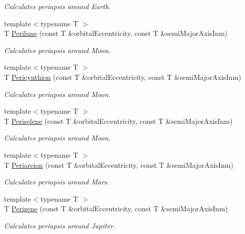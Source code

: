 \begin{DoxyCompactItemize}
\begin{DoxyCompactList}\small\item\em Calculates periapsis around Earth. \end{DoxyCompactList}\item 
{\footnotesize template$<$typename T $>$ }\\T \mbox{\hyperlink{group___e_g_x_phys-_periapsis_gac305fe72a19c1126bc7e72ef1de873a0}{Perilune}} (const T \&orbital\+Eccentricity, const T \&semi\+Major\+Axis\+Inm)
\begin{DoxyCompactList}\small\item\em Calculates periapsis around Moon. \end{DoxyCompactList}\item 
{\footnotesize template$<$typename T $>$ }\\T \mbox{\hyperlink{group___e_g_x_phys-_periapsis_ga101f47cc9ce1eb98aeec35fa5c9ba9e4}{Pericynthion}} (const T \&orbital\+Eccentricity, const T \&semi\+Major\+Axis\+Inm)
\begin{DoxyCompactList}\small\item\em Calculates periapsis around Moon. \end{DoxyCompactList}\item 
{\footnotesize template$<$typename T $>$ }\\T \mbox{\hyperlink{group___e_g_x_phys-_periapsis_ga91c6e1f3b6f98fe053bec87efcff4364}{Periselene}} (const T \&orbital\+Eccentricity, const T \&semi\+Major\+Axis\+Inm)
\begin{DoxyCompactList}\small\item\em Calculates periapsis around Moon. \end{DoxyCompactList}\item 
{\footnotesize template$<$typename T $>$ }\\T \mbox{\hyperlink{group___e_g_x_phys-_periapsis_ga27fbf6beeae240a9eeea35dae65b089a}{Periareion}} (const T \&orbital\+Eccentricity, const T \&semi\+Major\+Axis\+Inm)
\begin{DoxyCompactList}\small\item\em Calculates periapsis around Mars. \end{DoxyCompactList}\item 
{\footnotesize template$<$typename T $>$ }\\T \mbox{\hyperlink{group___e_g_x_phys-_periapsis_ga8899642f7f872817c611240819b2b968}{Perizene}} (const T \&orbital\+Eccentricity, const T \&semi\+Major\+Axis\+Inm)
\begin{DoxyCompactList}\small\item\em Calculates periapsis around Jupiter. \end{DoxyCompactList}\item 

\end{DoxyCompactItemize}
